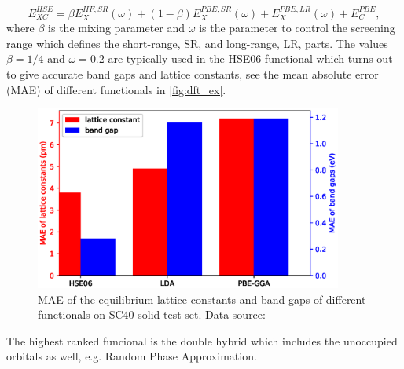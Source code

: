 \begin{equation}
E_{XC}^{HSE}=\beta E_X^{HF,SR}(\omega)+(1-\beta)E_X^{PBE,SR}(\omega)+E_X^{PBE,LR}(\omega)+E_C^{PBE},
\end{equation}
where $\beta$ is the mixing parameter and $\omega$ is the parameter to control the screening range which defines the short-range, SR, and long-range, LR, parts. The values $\beta=1/4$ and $\omega=0.2$ are typically used in the HSE06 functional which turns out to give accurate band gaps and lattice constants, see the mean absolute error (MAE) of different functionals in \autoref{fig:dft_ex}. 
\begin{figure}[htbp!] 
\centering  
\includegraphics[width=0.9\textwidth]{lat_ex.eps}
\caption[The MAE of the equilibrium lattice constant and band gap of different functionals]{ MAE of the equilibrium lattice constants and band gaps of different functionals on SC40 solid test set\protect\footnotemark[1]. Data source: \cite{Lucero2012}}  
\label{fig:dft_ex}
\end{figure} 
The highest ranked funcional is the double hybrid which includes the unoccupied orbitals as well, e.g. Random Phase Approximation\cite{Langreth1980}. 
